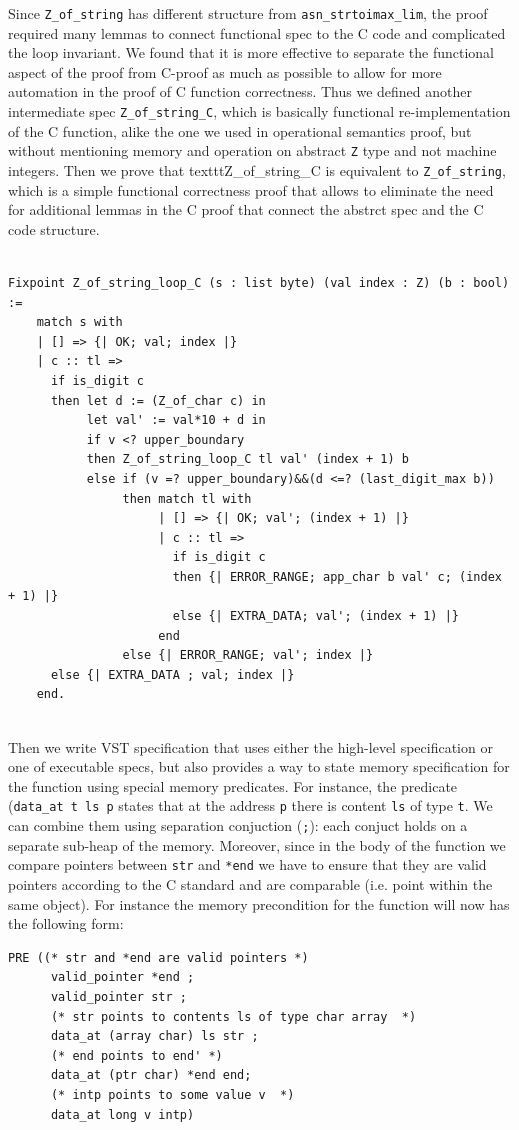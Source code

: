 \documentclass[acmsmall,nonacm]{acmart}
\begin{document}
Since \texttt{Z\_of\_string} has different structure from \texttt{asn\_strtoimax\_lim}, the proof required many lemmas to connect functional spec to the C code and complicated the loop invariant. We found that it is more effective to separate the functional aspect of the proof from C-proof as much as possible to allow for more automation in the proof of C function correctness. Thus we defined another intermediate spec \texttt{Z\_of\_string\_C}, which is basically functional re-implementation of the C function, alike the one we used in operational semantics proof, but without mentioning memory and operation on abstract \texttt{Z} type and not machine integers. Then we prove that texttt{Z\_of\_string\_C} is equivalent to \texttt{Z\_of\_string}, which is a simple functional correctness proof that allows to eliminate the need for additional lemmas in the C proof that connect the abstrct spec and the C code structure.

 \begin{lstlisting}[language=Coq]
 
Fixpoint Z_of_string_loop_C (s : list byte) (val index : Z) (b : bool) := 
    match s with 
    | [] => {| OK; val; index |}
    | c :: tl => 
      if is_digit c
      then let d := (Z_of_char c) in 
           let val' := val*10 + d in
           if v <? upper_boundary 
           then Z_of_string_loop_C tl val' (index + 1) b
           else if (v =? upper_boundary)&&(d <=? (last_digit_max b))
                then match tl with
                     | [] => {| OK; val'; (index + 1) |}
                     | c :: tl => 
                       if is_digit c
                       then {| ERROR_RANGE; app_char b val' c; (index + 1) |}
                       else {| EXTRA_DATA; val'; (index + 1) |}
                     end
                else {| ERROR_RANGE; val'; index |}      
      else {| EXTRA_DATA ; val; index |}              
    end.
    
 \end{lstlisting}

Then we write VST specification that uses either the high-level specification or one of executable specs, but also provides a way to state memory specification for the function using special memory predicates. For instance, the predicate (\texttt{data\_at t ls p} states that at the address \texttt{p} there is content \texttt{ls} of type \texttt{t}. We can combine them using separation conjuction (\texttt{;}): each conjuct holds on a separate sub-heap of the memory. Moreover, since in the body of the function we compare pointers between \texttt{str} and \texttt{*end} we have to ensure that they are valid pointers according to the C standard and are comparable (i.e. point within the same object). For instance the memory precondition for the function will now has the following form:
\begin{lstlisting}[language=Coq]
PRE ((* str and *end are valid pointers *)
      valid_pointer *end ;
      valid_pointer str ;
      (* str points to contents ls of type char array  *)
      data_at (array char) ls str ; 
      (* end points to end' *)
      data_at (ptr char) *end end;
      (* intp points to some value v  *)
      data_at long v intp)
     \end{lstlisting}
\end{document}
